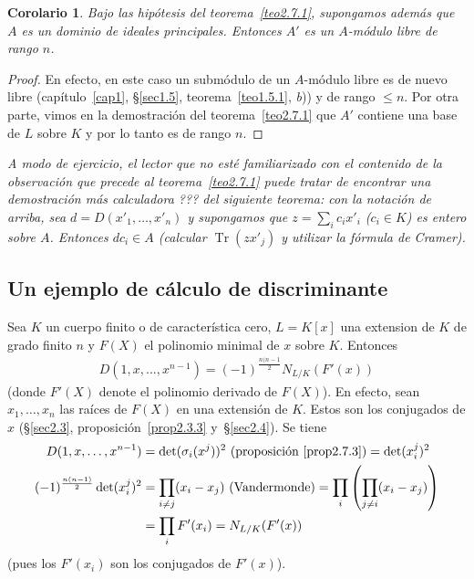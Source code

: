\documentclass[oneside,bibtotoc,leqno,spanish]{amsbook}
\DeclareMathOperator{\Tr}{Tr}
\numberwithin{equation}{section}
\newenvironment{comm}%
	{\begin{trivlist}\item\small\itshape}
	{\end{trivlist}}
\theoremstyle{defi}
\theoremstyle{note}
\newtheorem*{corollary*}{Corolario}
\theoremstyle{rem}
\numberwithin{theorem}{section}
\numberwithin{proposition}{section}
\numberwithin{definition}{section}
\numberwithin{lemma}{section}
\numberwithin{corollary}{section}
\numberwithin{example}{section}
\numberwithin{footnote}{section}%
\begin{document}
\begin{corollary*}
Bajo las hip\'otesis del teorema~\ref{teo2.7.1}, supongamos adem\'as que $A$ es un dominio de ideales principales. Entonces
$A'$ es un $A$-m\'odulo libre de rango $n$.
\end{corollary*}

\begin{proof}
En efecto, en este caso un subm\'odulo de un $A$-m\'odulo libre es de nuevo libre
(cap\'itulo~\ref{cap1}, \S\ref{sec1.5}, teorema~\ref{teo1.5.1}, {\itshape b}))
y de rango $\leq n$. Por otra parte, vimos en la demostraci\'on del teorema~\ref{teo2.7.1} que $A'$ contiene una base de $L$ sobre
$K$ y por lo tanto es de rango $n$.
\end{proof}

\begin{comm}
A modo de ejercicio, el lector que no est\'e familiarizado con el contenido de la observaci\'on que
precede al teorema~\ref{teo2.7.1} puede tratar de encontrar una demostraci\'on m\'as calculadora ??? del siguiente teorema:
con la notaci\'on de arriba, sea $d = D(x'_{1},\dots,x'_{n})$ y supongamos que $z = \sum_{i}c_{i}x'_{i}$
($c_{i}\in K$) es entero sobre $A$. Entonces $dc_{i}\in A$ (calcular $\Tr(zx'_{j})$ y utilizar la f\'ormula de
Cramer).
\end{comm}

\subsection*{Un ejemplo de c\'alculo de discriminante}

Sea $K$ un cuerpo finito o de caracter\'istica cero, $L = K[x]$ una extension de $K$ de grado finito $n$ y
$F(X)$ el polinomio minimal de $x$ sobre $K$. Entonces
\begin{gather}\label{eq2.7.6}
D(1,x,\dots,x^{n-1})=(-1)^{\frac{n(n-1}{2}}N_{L/K}(F'(x))
\end{gather}
(donde $F'(X)$ denote el polinomio derivado de $F(X)$). En efecto, sean $x_{1},\dots,x_{n}$ las ra\'ices de
$F(X)$ en una extensi\'on de $K$. Estos son los conjugados de $x$
(\S\ref{sec2.3}, proposici\'on~\ref{prop2.3.3} y~\S\ref{sec2.4}). Se tiene
\begin{align*}
D(1,x,\dots,x^{n-1}) &= \det(\sigma_{i}(x^{j}))^{2}\text{ (proposici\'on~\ref{prop2.7.3})} = \det(x_{i}^{j})^{2}\\
(-1)^{\frac{n(n-1)}{2}}\det(x_{i}^{j})^{2} &= \prod_{i\neq j}(x_{i}-x_{j})\text{ (Vandermonde)} =
\prod_{i}\left(\prod_{j\neq i}(x_{i}-x_{j})\right)\\
&=\prod_{i}F'(x_{i}) = N_{L/K}(F'(x))
\end{align*}
(pues los $F'(x_{i})$ son los conjugados de $F'(x)$).
\end{document}
